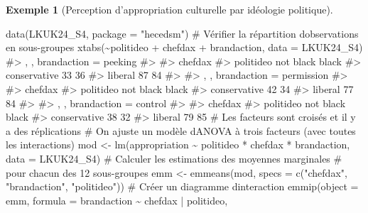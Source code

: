 \documentclass[
  11pt,
  letterpaper,
]{scrbook}
\newenvironment{Shaded}{\begin{snugshade}}{\end{snugshade}}
\newcommand{\AttributeTok}[1]{\textcolor[rgb]{0.40,0.45,0.13}{#1}}
\newcommand{\CommentTok}[1]{\textcolor[rgb]{0.37,0.37,0.37}{#1}}
\newcommand{\FunctionTok}[1]{\textcolor[rgb]{0.28,0.35,0.67}{#1}}
\newcommand{\NormalTok}[1]{\textcolor[rgb]{0.00,0.23,0.31}{#1}}
\newcommand{\OtherTok}[1]{\textcolor[rgb]{0.00,0.23,0.31}{#1}}
\newcommand{\SpecialCharTok}[1]{\textcolor[rgb]{0.37,0.37,0.37}{#1}}
\newcommand{\StringTok}[1]{\textcolor[rgb]{0.13,0.47,0.30}{#1}}
\theoremstyle{plain}
\theoremstyle{plain}
\theoremstyle{definition}
\newtheorem{example}{Exemple}[chapter]
\theoremstyle{definition}
\theoremstyle{remark}
\begin{document}
\begin{example}[Perception d'appropriation culturelle par idéologie
politique]
\begin{Shaded}
\begin{Highlighting}[]
\FunctionTok{data}\NormalTok{(LKUK24\_S4, }\AttributeTok{package =} \StringTok{"hecedsm"}\NormalTok{)}
\CommentTok{\# Vérifier la répartition d\textquotesingle{}observations en sous{-}groupes}
\FunctionTok{xtabs}\NormalTok{(}\SpecialCharTok{\textasciitilde{}}\NormalTok{politideo }\SpecialCharTok{+}\NormalTok{ chefdax }\SpecialCharTok{+}\NormalTok{ brandaction,}
          \AttributeTok{data =}\NormalTok{ LKUK24\_S4)}
\CommentTok{\#\textgreater{} , , brandaction = peeking}
\CommentTok{\#\textgreater{} }
\CommentTok{\#\textgreater{}               chefdax}
\CommentTok{\#\textgreater{} politideo      not black black}
\CommentTok{\#\textgreater{}   conservative        33    36}
\CommentTok{\#\textgreater{}   liberal             87    84}
\CommentTok{\#\textgreater{} }
\CommentTok{\#\textgreater{} , , brandaction = permission}
\CommentTok{\#\textgreater{} }
\CommentTok{\#\textgreater{}               chefdax}
\CommentTok{\#\textgreater{} politideo      not black black}
\CommentTok{\#\textgreater{}   conservative        42    34}
\CommentTok{\#\textgreater{}   liberal             77    84}
\CommentTok{\#\textgreater{} }
\CommentTok{\#\textgreater{} , , brandaction = control}
\CommentTok{\#\textgreater{} }
\CommentTok{\#\textgreater{}               chefdax}
\CommentTok{\#\textgreater{} politideo      not black black}
\CommentTok{\#\textgreater{}   conservative        38    32}
\CommentTok{\#\textgreater{}   liberal             79    85}
\CommentTok{\# Les facteurs sont croisés et il y a des réplications}
\CommentTok{\# On ajuste un modèle d\textquotesingle{}ANOVA à trois facteurs (avec toutes les interactions)}
\NormalTok{mod }\OtherTok{\textless{}{-}} \FunctionTok{lm}\NormalTok{(appropriation }\SpecialCharTok{\textasciitilde{}}\NormalTok{ politideo }\SpecialCharTok{*}\NormalTok{ chefdax }\SpecialCharTok{*}\NormalTok{ brandaction,}
          \AttributeTok{data =}\NormalTok{ LKUK24\_S4)}
\CommentTok{\# Calculer les estimations des moyennes marginales }
\CommentTok{\# pour chacun des 12 sous{-}groupes}
\NormalTok{emm }\OtherTok{\textless{}{-}} \FunctionTok{emmeans}\NormalTok{(mod, }
        \AttributeTok{specs =} \FunctionTok{c}\NormalTok{(}\StringTok{"chefdax"}\NormalTok{, }\StringTok{"brandaction"}\NormalTok{, }\StringTok{"politideo"}\NormalTok{))}
\CommentTok{\# Créer un diagramme d\textquotesingle{}interaction}
\FunctionTok{emmip}\NormalTok{(}\AttributeTok{object =}\NormalTok{ emm, }
        \AttributeTok{formula =}\NormalTok{ brandaction }\SpecialCharTok{\textasciitilde{}}\NormalTok{ chefdax }\SpecialCharTok{|}\NormalTok{ politideo, }

\end{Highlighting}
\end{Shaded}
\end{example}
\end{document}
